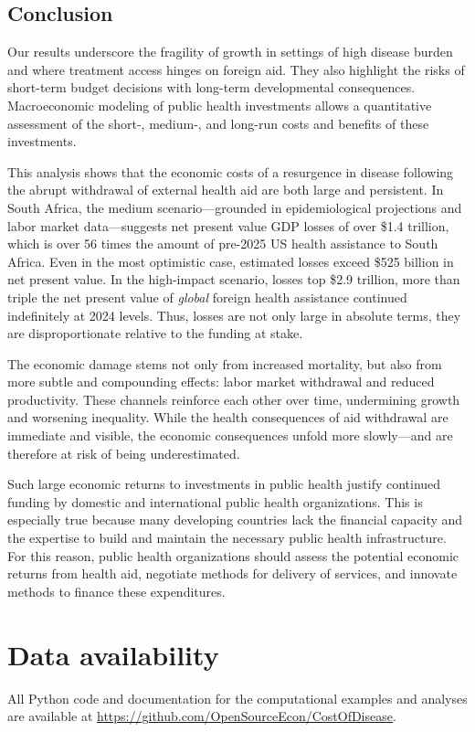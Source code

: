 \documentclass[letterpaper,12pt]{article}
\theoremstyle{definition}
\begin{document}
\begin{spacing}{1.5}
\section{Conclusion}\label{SecConc}

Our results underscore the fragility of growth in settings of high disease burden and where treatment access hinges on foreign aid. They also highlight the risks of short-term budget decisions with long-term developmental consequences. Macroeconomic modeling of public health investments allows a quantitative assessment of the short-, medium-, and long-run costs and benefits of these investments.

This analysis shows that the economic costs of a resurgence in disease following the abrupt withdrawal of external health aid are both large and persistent. In South Africa, the medium scenario---grounded in epidemiological projections and labor market data---suggests net present value GDP losses of over \$1.4 trillion, which is over 56 times the amount of pre-2025 US health assistance to South Africa. Even in the most optimistic case, estimated losses exceed \$525 billion in net present value. In the high-impact scenario, losses top \$2.9 trillion, more than triple the net present value of \emph{global} foreign health assistance continued indefinitely at 2024 levels. Thus, losses are not only large in absolute terms, they are disproportionate relative to the funding at stake.

The economic damage stems not only from increased mortality, but also from more subtle and compounding effects: labor market withdrawal and reduced productivity.  These channels reinforce each other over time, undermining growth and worsening inequality. While the health consequences of aid withdrawal are immediate and visible, the economic consequences unfold more slowly—and are therefore at risk of being underestimated.

Such large economic returns to investments in public health justify continued funding by domestic and international public health organizations. This is especially true because many developing countries lack the financial capacity and the expertise to build and maintain the necessary public health infrastructure. For this reason, public health organizations should assess the potential economic returns from health aid, negotiate methods for delivery of services, and innovate methods to finance these expenditures.

\end{spacing}

\section*{Data availability}

All Python code and documentation for the computational examples and analyses are available at \href{https://github.com/OpenSourceEcon/CostOfDisease}{https://github.com/OpenSourceEcon/CostOfDisease}.

\end{document}
